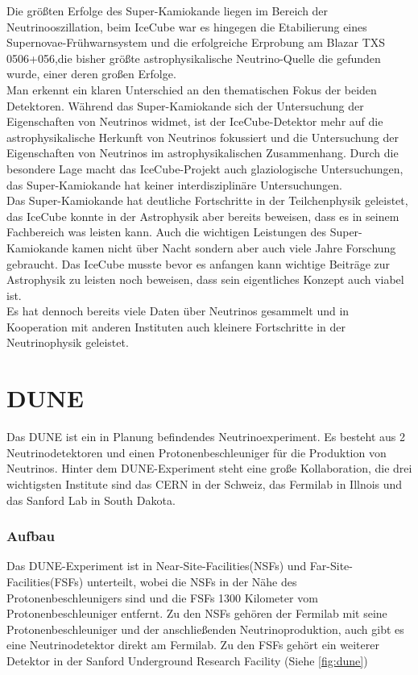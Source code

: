 Die größten Erfolge des Super-Kamiokande liegen im Bereich der Neutrinooszillation, beim IceCube war es hingegen die 
Etabilierung eines Supernovae-Frühwarnsystem und die erfolgreiche Erprobung am Blazar TXS 0506+056,die bisher größte astrophysikalische 
Neutrino-Quelle die gefunden wurde, einer deren großen Erfolge. \\
Man erkennt ein klaren Unterschied an den thematischen Fokus der beiden Detektoren. Während das Super-Kamiokande sich der 
Untersuchung der Eigenschaften von Neutrinos widmet, ist der IceCube-Detektor mehr auf die astrophysikalische Herkunft von
Neutrinos fokussiert und die Untersuchung der Eigenschaften von Neutrinos im astrophysikalischen Zusammenhang. 
Durch die besondere Lage macht das IceCube-Projekt auch glaziologische Untersuchungen, das Super-Kamiokande hat keiner
interdisziplinäre Untersuchungen. \\
Das Super-Kamiokande hat deutliche Fortschritte in der Teilchenphysik geleistet, das IceCube konnte in der Astrophysik
aber bereits beweisen, dass es in seinem Fachbereich was leisten kann. Auch die wichtigen Leistungen des Super-Kamiokande kamen 
nicht über Nacht sondern aber auch viele Jahre Forschung gebraucht. Das IceCube musste bevor es anfangen kann wichtige Beiträge
zur Astrophysik zu leisten noch beweisen, dass sein eigentliches Konzept auch viabel ist. \\
Es hat dennoch bereits viele Daten über Neutrinos gesammelt und in Kooperation mit anderen Instituten auch kleinere Fortschritte
in der Neutrinophysik geleistet. 

\section{DUNE}

Das DUNE ist ein in Planung befindendes Neutrinoexperiment. Es besteht aus 2 Neutrinodetektoren und einen Protonenbeschleuniger 
für die Produktion von Neutrinos. Hinter dem DUNE-Experiment steht eine große Kollaboration, die drei wichtigsten Institute
sind das CERN in der Schweiz, das Fermilab in Illnois und das Sanford Lab in South Dakota.  

\subsubsection{Aufbau}

Das DUNE-Experiment ist in Near-Site-Facilities(NSFs) und Far-Site-Facilities(FSFs) unterteilt, wobei die NSFs in der Nähe des 
Protonenbeschleunigers sind und die FSFs 1300 Kilometer vom Protonenbeschleuniger entfernt.
Zu den NSFs gehören der Fermilab mit seine Protonenbeschleuniger und der anschließenden Neutrinoproduktion, auch
gibt es eine Neutrinodetektor direkt am Fermilab. Zu den FSFs gehört ein weiterer Detektor in der Sanford Underground
Research Facility (Siehe \ref{fig:dune})

